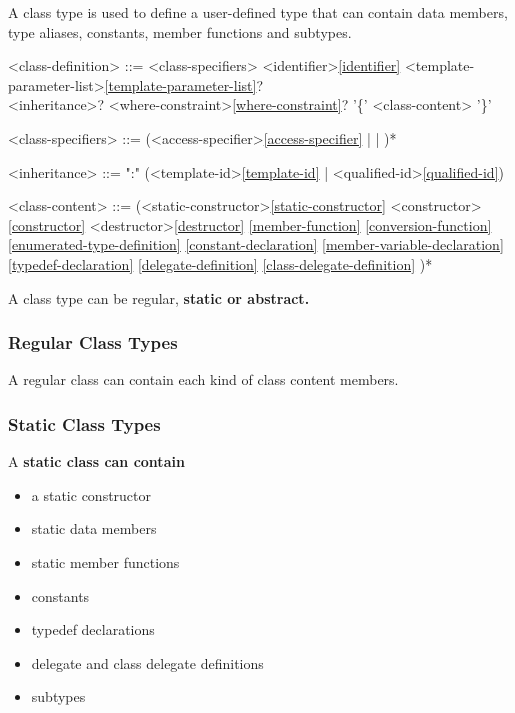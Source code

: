 \documentclass[a4paper,oneside,11pt]{article}
\begin{document}
A class type is used to define a user-defined type that can contain data members, type aliases, constants, member functions and subtypes.

\begin{grammar}
\label{class-definition}<class-definition> ::= <class-specifiers>  <identifier>\ref{identifier} <template-parameter-list>\ref{template-parameter-list}?\\
<inheritance>? <where-constraint>\ref{where-constraint}? '\{' <class-content> '\}'

<class-specifiers> ::= (<access-specifier>\ref{access-specifier} |  | )*

<inheritance> ::= ":" (<template-id>\ref{template-id} | <qualified-id>\ref{qualified-id})

<class-content> ::= (<static-constructor>\ref{static-constructor}
\alt <constructor>\ref{constructor}
\alt <destructor>\ref{destructor}
\ref{member-function}
\ref{conversion-function}
\ref{enumerated-type-definition}
\ref{constant-declaration}
\ref{member-variable-declaration}
\ref{typedef-declaration}
\ref{delegate-definition}
\ref{class-delegate-definition}
)*
\end{grammar}

A class type can be regular, \bf{static} or \bf{abstract}.

\subsubsection{Regular Class Types}

A regular class can contain each kind of class content members.

\subsubsection{Static Class Types}

A \bf{static} class can contain
\begin{itemize}
\item a static constructor
\item static data members
\item static member functions
\item constants
\item typedef declarations
\item delegate and class delegate definitions
\item subtypes
\end{itemize}
\end{document}
